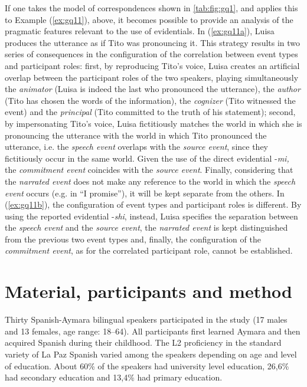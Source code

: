 \documentclass[output=paper]{langsci/langscibook}
\begin{document}
If one takes the model of correspondences shown in \ref{tab:fig:gq1}, and applies this to Example (\ref{ex:gq11}), above, it becomes possible to provide an analysis of the pragmatic features relevant to the use of evidentials. In (\ref{ex:gq11a}), Luisa produces the utterance as if Tito was pronouncing it. This strategy results in two series of consequences in the configuration of the correlation between event types and participant roles: first, by reproducing Tito’s voice, Luisa creates an artificial overlap between the participant roles of the two speakers, playing simultaneously the \textit{animator} (Luisa is indeed the last who pronounced the utterance), the \textit{author} (Tito has chosen the words of the information), the \textit{cognizer} (Tito witnessed the event) and the \textit{principal} (Tito committed to the truth of his statement); second, by impersonating Tito’s voice, Luisa fictitiously matches the world in which she is pronouncing the utterance with the world in which Tito pronounced the utterance, i.e. the \textit{speech event} overlaps with the \textit{source event}, since they fictitiously occur in the same world. Given the use of the direct evidential -\textit{mi,} the \textit{commitment event} coincides with the \textit{source event}. Finally, considering that the \textit{narrated event} does not make any reference to the world in which the \textit{speech event} occurs (e.g. in “I promise”), it will be kept separate from the others. In (\ref{ex:gq11b}), the configuration of event types and participant roles is different. By using the reported evidential -\textit{shi}, instead, Luisa specifies the separation between the \textit{speech event} and the \textit{source event}, the \textit{narrated event} is kept distinguished from the previous two event types and, finally, the configuration of the \textit{commitment event}, as for the correlated participant role, cannot be established. 

\section{Material, participants and method}\label{s:gq3}

Thirty Spanish-Aymara bilingual speakers participated in the study (17 males and 13 females, age range: 18--64). All participants first learned Aymara and then acquired Spanish during their childhood. The L2 proficiency in the standard variety of La Paz Spanish varied among the speakers depending on age and level of education. About 60\% of the speakers had university level education, 26,6\% had secondary education and 13,4\% had primary education. 
\end{document}

